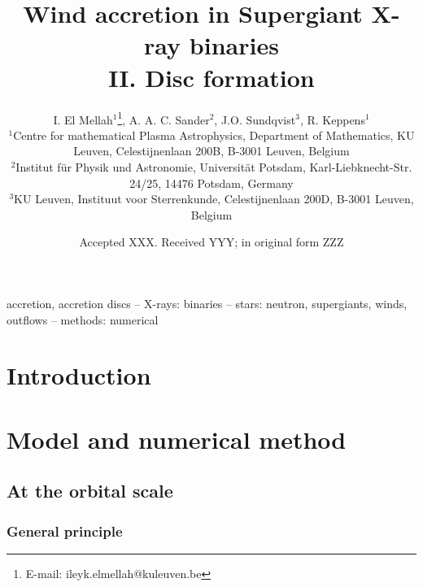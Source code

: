 \documentclass[a4paper,fleqn,usenatbib]{mnras}
\title[Disc formation in SgXB]{Wind accretion in Supergiant X-ray binaries\\II. Disc formation}
\author[I. El Mellah, A. A. C. Sander, J.O. Sundqvist, R. Keppens]{
I. El Mellah$^{1}$\thanks{E-mail: ileyk.elmellah@kuleuven.be},
A. A. C. Sander$^{2}$,
J.O. Sundqvist$^{3}$,
R. Keppens$^{1}$
\\
$^{1}$Centre for mathematical Plasma Astrophysics, Department of Mathematics, KU Leuven, Celestijnenlaan 200B, B-3001 Leuven, Belgium\\
$^{2}$Institut f{\"u}r Physik und Astronomie, Universit{\"a}t Potsdam, Karl-Liebknecht-Str. 24/25, 14476 Potsdam, Germany\\
$^{3}$KU Leuven, Instituut voor Sterrenkunde, Celestijnenlaan 200D, B-3001 Leuven, Belgium
}
\date{Accepted XXX. Received YYY; in original form ZZZ}
\begin{document}
\label{firstpage}
\pagerange{\pageref{firstpage}--\pageref{lastpage}}
\maketitle

\begin{abstract}

\end{abstract}

\begin{keywords}
accretion, accretion discs -- X-rays: binaries -- stars: neutron, supergiants, winds, outflows -- methods: numerical 
\end{keywords}



\section{Introduction}
\label{sec:intro}


\section{Model and numerical method}
\label{sec:model}

\subsection{At the orbital scale}
\label{sec:orb_scale}
\subsubsection{General principle}
\label{sec:pple}
\end{document}
